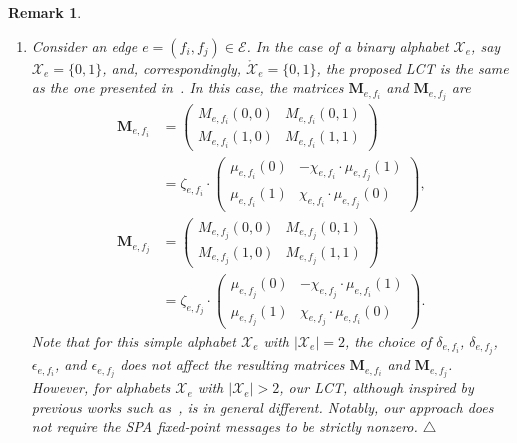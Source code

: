 \documentclass[journal]{IEEEtran}
\newcommand{\add}[1]{{\color{black}#1}}
\newtheorem{remark}[theorem]{Remark}
\newcommand{\manualendsymbol}[1]{%
  \leavevmode\unskip\penalty9999\hbox{}\nobreak\hfill
  \quad\hbox{#1}}
\newcommand{\eremark}{\manualendsymbol{\ensuremath{\triangle}}}
\newcommand{\vect}[1]{ \bm{#1} }
\newcommand{\set}[1]{\mathcal{#1}}
\newcommand{\setEfull}{ \mathcal{E} }
\newcommand{\matr}[1]{\vect{#1}}
\newcommand{\LCTset}[1]{\mathring{\mathcal{#1}}}
\newcommand{\efi}{ e,f_i }
\newcommand{\efj}{ e,f_j }
\newcommand{\LCTsetxe}{ \LCTset{X}_{e} }
\begin{document}
\begin{remark}
\begin{enumerate}
    \item Consider an edge $ e =(f_{i}, f_{j}) \in \setEfull $.
          In the case of a binary alphabet $\set{X}_e$, say $\set{X}_e = \{ 0, 1 \}$, and,
          correspondingly, $\LCTsetxe = \{ 0, 1 \}$, the proposed LCT  is the same
          as the one presented in~\cite{Chertkov2006}.
          In this case, the matrices
          $ \matr{M}_{\efi} $ and $ \matr{M}_{\efj} $
          are
          \begin{align*}
            \matr{M}_{\efi}
             & =
            \begin{pmatrix}
              M_{\efi}(0,0) & M_{\efi}(0,1) \\
              M_{\efi}(1,0) & M_{\efi}(1,1)
            \end{pmatrix} \\
             & =
            \zeta_{\efi}
            \cdot
            \begin{pmatrix}
              \mu_{\efi}(0) & - \chi_{\efi} \cdot \mu_{\efj}(1) \\
              \mu_{\efi}(1) & \chi_{\efi} \cdot \mu_{\efj}(0)
            \end{pmatrix},
            \\
            \matr{M}_{\efj}
             & =
            \begin{pmatrix}
              M_{\efj}(0,0) & M_{\efj}(0,1) \\
              M_{\efj}(1,0) & M_{\efj}(1,1)
            \end{pmatrix} \\
             & =
            \zeta_{\efj}
            \cdot
            \begin{pmatrix}
              \mu_{\efj}(0) & - \chi_{\efj} \cdot \mu_{\efi}(1) \\
              \mu_{\efj}(1) & \chi_{\efj} \cdot \mu_{\efi}(0)
            \end{pmatrix}.
          \end{align*}
          \add{Note that for this simple alphabet $\set{X}_e$ with
            $|\set{X}_e| = 2$, the choice of $\delta_{\efi}$, $\delta_{\efj}$,
            $\epsilon_{\efi}$, and $\epsilon_{\efj}$ does not affect the
            resulting matrices $\matr{M}_{\efi}$ and $\matr{M}_{\efj}$.
            However, for alphabets $\set{X}_e$ with $|\set{X}_e| > 2$, our
            LCT, although inspired by previous works such
            as~\cite{Chertkov2006, Chernyak2007, Mori2015}, is in general
            different. Notably, our approach does not require the SPA
            fixed-point messages to be strictly nonzero.} \eremark
  \end{enumerate}

\end{remark}
\end{document}
